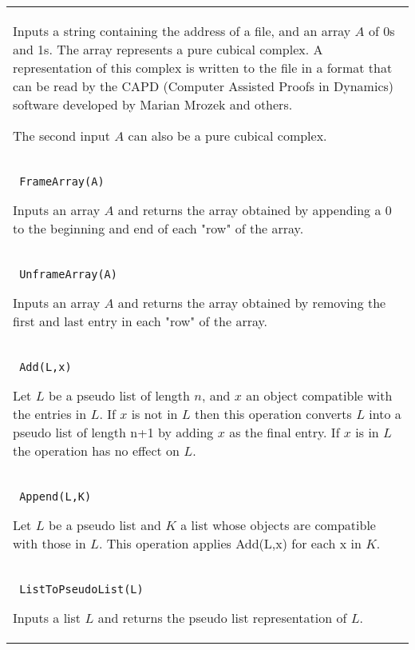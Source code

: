 \documentclass[a4paper,11pt]{report}
\begin{document}
{\begin{center}
\begin{tabular}{|l|}
 Inputs a string containing the address of a file, and an array $A$ of 0s and 1s. The array represents a pure cubical complex. A representation of
this complex is written to the file in a format that can be read by the CAPD
(Computer Assisted Proofs in Dynamics) software developed by Marian Mrozek and
others. 

 The second input $A$ can also be a pure cubical complex. \\
 \index{FrameArray} \texttt{ FrameArray(A)} 

 Inputs an array $A$ and returns the array obtained by appending a 0 to the beginning and end of
each "row" of the array. \\
 \index{UnframeArray} \texttt{ UnframeArray(A)} 

 Inputs an array $A$ and returns the array obtained by removing the first and last entry in each
"row" of the array. \\
 \index{Add} \texttt{ Add(L,x)} 

 Let $L$ be a pseudo list of length $n$, and $x$ an object compatible with the entries in $L$. If $x$ is not in $L$ then this operation converts $L$ into a pseudo list of length n+1 by adding $x$ as the final entry. If $x$ is in $L$ the operation has no effect on $L$. \\
 \index{Append} \texttt{ Append(L,K)} 

 Let $L$ be a pseudo list and $K$ a list whose objects are compatible with those in $L$. This operation applies Add(L,x) for each x in $K$. \\
 \index{ListToPseudoList} \texttt{ ListToPseudoList(L)} 

 Inputs a list $L$ and returns the pseudo list representation of $L$. \\
\end{tabular}\\[2mm]
\end{center}

 }

 
\end{document}

